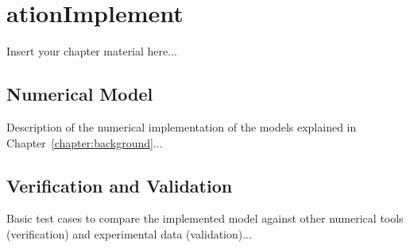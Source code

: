 
\chapter{ationImplement}
\label{chapter:implementation}

Insert your chapter material here...

\section{Numerical Model}
\label{section:model}

Description of the numerical implementation of the models explained in Chapter~\ref{chapter:background}...


\section{Verification and Validation}
\label{section:verification}

Basic test cases to compare the implemented model against other numerical tools (verification) and experimental data (validation)...

